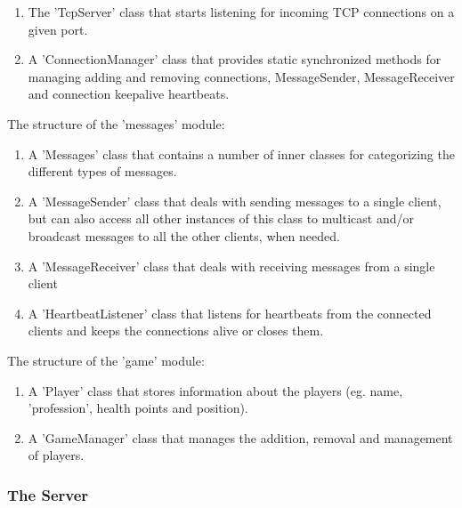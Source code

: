 \begin{enumerate}
  
  \item The 'TcpServer' class that starts listening for incoming TCP connections
  on a given port. 
	
  \item A 'ConnectionManager' class that provides static synchronized methods
  for managing adding and removing connections, MessageSender, MessageReceiver
  and connection keepalive heartbeats.
  
\end{enumerate}

The structure of the 'messages' module:

\begin{enumerate}
  
  \item A 'Messages' class that contains a number of inner classes for
  categorizing the different types of messages.
  
  \item A 'MessageSender' class that deals with sending messages to a single
  client, but can also access all other instances of this class to multicast
  and/or broadcast messages to all the other clients, when needed.
  
  \item A 'MessageReceiver' class that deals with receiving messages from a
  single client
  
  \item A 'HeartbeatListener' class that listens for heartbeats from the
  connected clients and keeps the connections alive or closes them.
  
\end{enumerate}

The structure of the 'game' module:

\begin{enumerate}
  
  \item A 'Player' class that stores information about the players (eg. name,
  'profession', health points and position).
  
  \item A 'GameManager' class that manages the addition, removal and management
  of players.
  
\end{enumerate}

\subsubsection{The Server}

